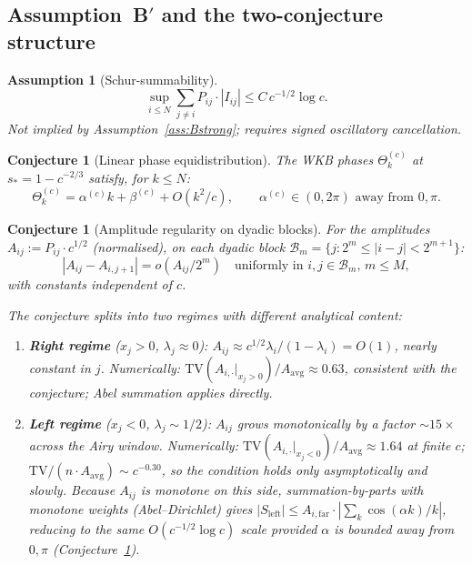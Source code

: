 \documentclass[12pt,a4paper]{article}
\newtheorem{assumption}[theorem]{Assumption}
\newtheorem{conjecture}[theorem]{Conjecture}
\begin{document}
\subsection{Assumption~B$'$ and the two-conjecture structure}

\begin{assumption}[Schur-summability]\label{ass:Bprime}
\[
  \sup_{i\leq N}\sum_{j\neq i}P_{ij}\cdot|I_{ij}|
  \leq C\,c^{-1/2}\log c.
\]
Not implied by Assumption~\ref{ass:Bstrong};
requires signed oscillatory cancellation.
\end{assumption}

\begin{conjecture}[Linear phase equidistribution]
\label{conj:phase}
The WKB phases $\Theta_k^{(c)}$ at $s_*=1-c^{-2/3}$ satisfy,
for $k\leq N$:
\[
  \Theta_k^{(c)}=\alpha^{(c)}k+\beta^{(c)}+O(k^2/c),
  \qquad
  \alpha^{(c)}\in(0,2\pi)\text{ away from }0,\pi.
\]
\end{conjecture}

\begin{conjecture}[Amplitude regularity on dyadic blocks]
\label{conj:amplitude}
For the amplitudes $A_{ij}:=P_{ij}\cdot c^{1/2}$ (normalised),
on each dyadic block $\mathcal{B}_m=\{j:2^m\leq|i-j|<2^{m+1}\}$:
\[
  |A_{ij}-A_{i,j+1}|=o(A_{ij}/2^m)\quad
  \text{uniformly in }i,j\in\mathcal{B}_m,\,m\leq M,
\]
with constants independent of $c$.

The conjecture splits into two regimes with different analytical content:
\begin{enumerate}[nosep,label=(\alph*)]
  \item \textbf{Right regime} ($x_j > 0$, $\lambda_j \approx 0$):
        $A_{ij} \approx c^{1/2}\lambda_i/(1-\lambda_i) = O(1)$,
        nearly constant in $j$.
        Numerically: $\mathrm{TV}(A_{i,\cdot}|_{x_j>0})/A_{\mathrm{avg}}
        \approx 0.63$, consistent with the conjecture;
        Abel summation applies directly.
  \item \textbf{Left regime} ($x_j < 0$, $\lambda_j \sim 1/2$):
        $A_{ij}$ grows monotonically by a factor $\sim 15\times$
        across the Airy window.
        Numerically: $\mathrm{TV}(A_{i,\cdot}|_{x_j<0})/A_{\mathrm{avg}}
        \approx 1.64$ at finite $c$;
        $\mathrm{TV}/(n\cdot A_{\mathrm{avg}}) \sim c^{-0.30}$,
        so the condition holds only asymptotically and slowly.
        Because $A_{ij}$ is \emph{monotone} on this side,
        summation-by-parts with monotone weights (Abel--Dirichlet)
        gives $|S_{\mathrm{left}}| \leq A_{i,\mathrm{far}}
        \cdot |\sum_k \cos(\alpha k)/k|$,
        reducing to the same $O(c^{-1/2}\log c)$ scale provided
        $\alpha$ is bounded away from $0,\pi$
        (Conjecture~\ref{conj:phase}).
\end{enumerate}
\end{conjecture}
\end{document}
